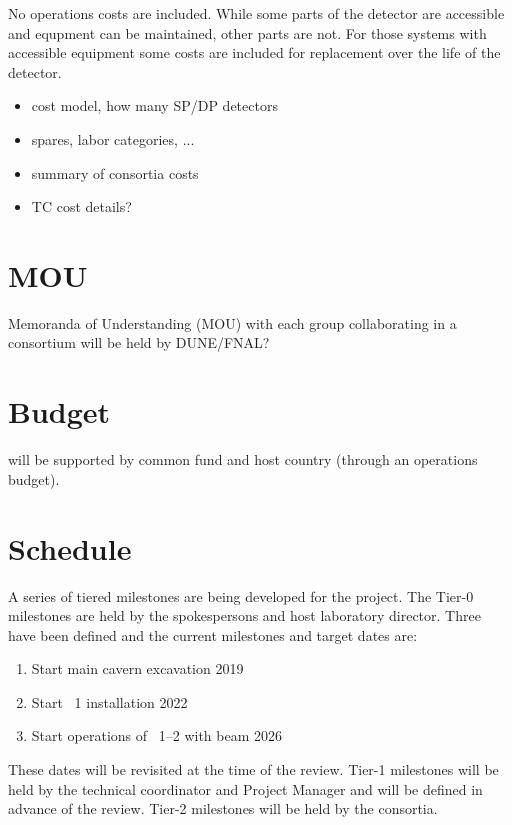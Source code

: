 No operations costs are included. While some parts of the detector are
accessible and equpment can be maintained, other parts are not. For
those systems with accessible equipment some costs are included for
replacement over the life of the detector.

\begin{itemize}
 \item cost model, how many SP/DP detectors
 \item spares, labor categories, ...
 \item summary of consortia costs
 \item TC cost details?
\end{itemize}

\section{MOU}
\label{sec:fdsp-coord-mou}

Memoranda of Understanding (MOU) with each group collaborating in a
consortium will be held by DUNE/FNAL?

\section{Budget}
\label{sec:fdsp-coord-budget}

  will be supported by common fund and host
country (through an operations budget).

\section{Schedule}
\label{sec:fdsp-coord-controls}

A series of tiered milestones are being developed for the 
project. The Tier-0 milestones are held by the spokespersons and host
laboratory director. Three have been defined and the current milestones and
target dates are:
\begin{enumerate}
\item Start main cavern excavation \hspace{2.62in} 2019
\item Start ~1 installation \hspace{2.1in} 2022
\item Start operations of ~1--2 with beam \hspace{1in} 2026
\end{enumerate}
These dates will be revisited at the time of the  review.  Tier-1
milestones will be held by the technical coordinator and  Project
Manager and will be defined in advance of the  review. Tier-2
milestones will be held by the consortia.

